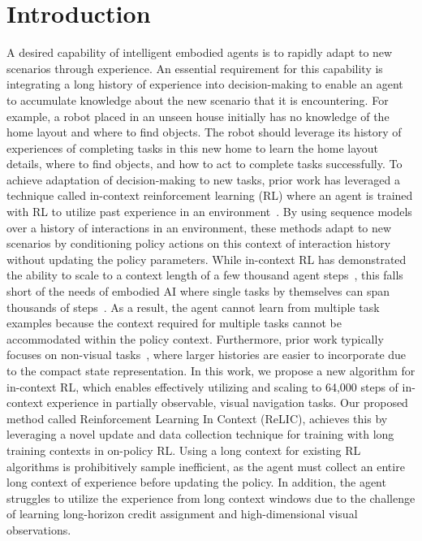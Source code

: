 \documentclass{article}
\newcommand{\Method}{Reinforcement Learning In Context \xspace}
\newcommand{\method}{ReLIC\xspace}
\begin{document}
\section{Introduction}
A desired capability of intelligent embodied agents is to rapidly adapt to new scenarios through experience.
An essential requirement for this capability is integrating a long history of experience into decision-making to enable an agent to accumulate knowledge about the new scenario that it is encountering.
For example, a robot placed in an unseen house initially has no knowledge of the home layout and where to find objects.
The robot should leverage its history of experiences of completing tasks in this new home to learn the home layout details, where to find objects, and how to act to complete tasks successfully.
To achieve adaptation of decision-making to new tasks, prior work has leveraged a technique called in-context reinforcement learning (RL) where an agent is trained with RL to utilize past experience in an environment~\citep{wang2016learning,team2023human,duan2016rl,grigsby2023amago,melo2022transformers}.
By using sequence models over a history of interactions in an environment, these methods adapt to new scenarios by conditioning policy actions on this context of interaction history without updating the policy parameters.
While in-context RL has demonstrated the ability to scale to a context length of a few thousand
agent steps~\citep{team2023human,grigsby2023amago}, this falls short of the needs of embodied AI where single tasks by themselves can span thousands of steps~\citep{szot2021habitat}.
As a result, the agent cannot learn from multiple task examples because the context required for multiple tasks cannot be accommodated within the policy context.
Furthermore, prior work typically focuses on non-visual tasks~\citep{grigsby2023amago,melo2022transformers,ni2023transformers}, where larger histories are easier to incorporate due to the compact state representation.
In this work, we propose a new algorithm for in-context RL, which enables effectively utilizing and scaling to 64,000 steps of in-context experience in partially observable, visual navigation tasks.
Our proposed method called \Method (\method), achieves this by leveraging a novel update and data collection technique for training with long training contexts in on-policy RL.
Using a long context for existing RL algorithms is prohibitively sample inefficient, as the agent must collect an entire long context of experience before updating the policy.
In addition, the agent struggles to utilize the experience from long context windows due to the challenge of learning long-horizon credit assignment and high-dimensional visual observations.
\end{document}
